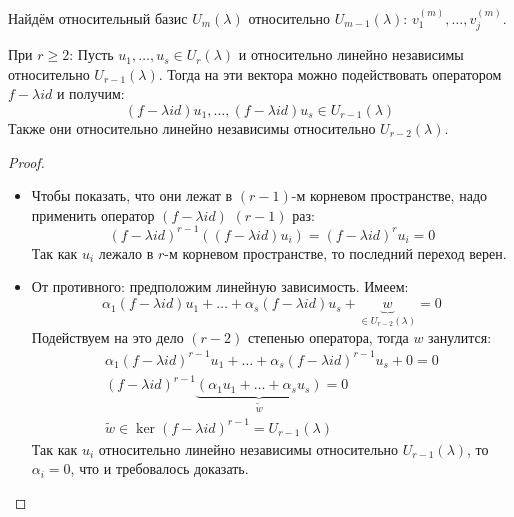 Найдём относительный базис $U_m(\lambda)$ относительно $U_{m-1}(\lambda)$: $v_1^{(m)}, \dots, v_j^{(m)}$.
\begin{lemma}\label{21_lemma}
	При $r \ge 2$:
	Пусть $u_1, \dots, u_s \in U_r(\lambda)$ и относительно линейно независимы относительно $U_{r-1}(\lambda)$.
	Тогда на эти вектора можно подействовать оператором $f-\lambda id$ и получим:
	\[ (f-\lambda id)u_1, \dots, (f-\lambda id)u_s \in U_{r-1}(\lambda)\]
	Также они относительно линейно независимы относительно $U_{r-2}(\lambda)$.
\end{lemma}
\begin{proof}
	\begin{itemize}
	\item
		Чтобы показать, что они лежат в $(r-1)$-м корневом пространстве, надо применить оператор $(f-\lambda id)$ $(r-1)$ раз:
		\[ (f - \lambda id)^{r-1} ((f-\lambda id) u_i) = (f - \lambda id)^r u_i = 0 \]
		Так как $u_i$ лежало в $r$-м корневом пространстве, то последний переход верен.
	\item
		От противного: предположим линейную зависимость.
		Имеем:
		\[ \alpha_1(f-\lambda id) u_1 + \dots + \alpha_s (f-\lambda id) u_s + \underbrace{w}_{\in U_{r-2}(\lambda)} = 0\]
		Подействуем на это дело $(r-2)$ степенью оператора, тогда $w$ занулится:
		\begin{gather*}
			\alpha_1(f-\lambda id)^{r-1} u_1 + \dots + \alpha_s (f-\lambda id)^{r-1} u_s + 0 = 0 \\
			(f-\lambda id)^{r-1}\underbrace{(\alpha_1 u_1 + \dots + \alpha_s u_s )}_{\widetilde w} = 0 \\
			\widetilde w \in \ker (f - \lambda id)^{r-1} = U_{r-1}(\lambda)
		\end{gather*}
		Так как $u_i$ относительно линейно независимы относительно $U_{r - 1}(\lambda)$, то $\alpha_i=0$,
		что и требовалось доказать.
	\end{itemize}
\end{proof}

